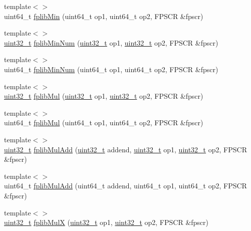 \begin{DoxyCompactItemize}
\item 
{\footnotesize template$<$$>$ }\\uint64\_\-t \hyperlink{namespaceArmISA_adccfc63adcbc150079bce67e7ec56c70}{fplibMin} (uint64\_\-t op1, uint64\_\-t op2, FPSCR \&fpscr)
\item 
{\footnotesize template$<$$>$ }\\\hyperlink{Type_8hh_a435d1572bf3f880d55459d9805097f62}{uint32\_\-t} \hyperlink{namespaceArmISA_acf433633709ae6dec5ce4dfa468003d7}{fplibMinNum} (\hyperlink{Type_8hh_a435d1572bf3f880d55459d9805097f62}{uint32\_\-t} op1, \hyperlink{Type_8hh_a435d1572bf3f880d55459d9805097f62}{uint32\_\-t} op2, FPSCR \&fpscr)
\item 
{\footnotesize template$<$$>$ }\\uint64\_\-t \hyperlink{namespaceArmISA_a3ca9e11dede5d04890a1ab1cb309eede}{fplibMinNum} (uint64\_\-t op1, uint64\_\-t op2, FPSCR \&fpscr)
\item 
{\footnotesize template$<$$>$ }\\\hyperlink{Type_8hh_a435d1572bf3f880d55459d9805097f62}{uint32\_\-t} \hyperlink{namespaceArmISA_a76377f5422d9c42beeb46d780d9e67fc}{fplibMul} (\hyperlink{Type_8hh_a435d1572bf3f880d55459d9805097f62}{uint32\_\-t} op1, \hyperlink{Type_8hh_a435d1572bf3f880d55459d9805097f62}{uint32\_\-t} op2, FPSCR \&fpscr)
\item 
{\footnotesize template$<$$>$ }\\uint64\_\-t \hyperlink{namespaceArmISA_a66fc4c66f4abf6a7af8bb4f8f60a1261}{fplibMul} (uint64\_\-t op1, uint64\_\-t op2, FPSCR \&fpscr)
\item 
{\footnotesize template$<$$>$ }\\\hyperlink{Type_8hh_a435d1572bf3f880d55459d9805097f62}{uint32\_\-t} \hyperlink{namespaceArmISA_a42dcc9fb6e3a3023d21c268e3e9b4165}{fplibMulAdd} (\hyperlink{Type_8hh_a435d1572bf3f880d55459d9805097f62}{uint32\_\-t} addend, \hyperlink{Type_8hh_a435d1572bf3f880d55459d9805097f62}{uint32\_\-t} op1, \hyperlink{Type_8hh_a435d1572bf3f880d55459d9805097f62}{uint32\_\-t} op2, FPSCR \&fpscr)
\item 
{\footnotesize template$<$$>$ }\\uint64\_\-t \hyperlink{namespaceArmISA_aa01f1b2bea210e2574431638c11bc4f8}{fplibMulAdd} (uint64\_\-t addend, uint64\_\-t op1, uint64\_\-t op2, FPSCR \&fpscr)
\item 
{\footnotesize template$<$$>$ }\\\hyperlink{Type_8hh_a435d1572bf3f880d55459d9805097f62}{uint32\_\-t} \hyperlink{namespaceArmISA_a3b7e2c49fcae44b9e8277cb5a8071b2a}{fplibMulX} (\hyperlink{Type_8hh_a435d1572bf3f880d55459d9805097f62}{uint32\_\-t} op1, \hyperlink{Type_8hh_a435d1572bf3f880d55459d9805097f62}{uint32\_\-t} op2, FPSCR \&fpscr)

\end{DoxyCompactItemize}
